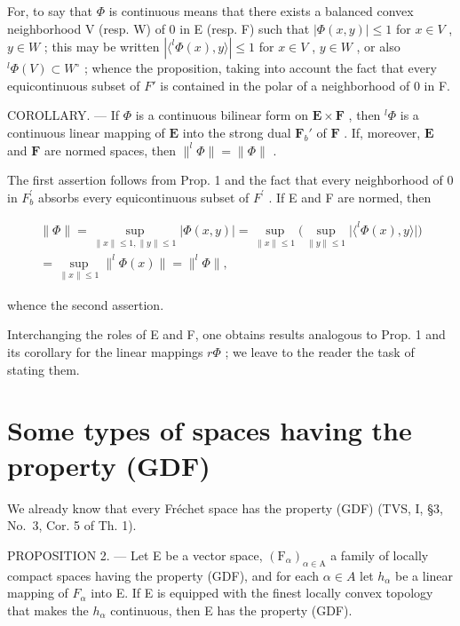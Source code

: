 For, to say that \(\Phi\) is continuous means that there exists a balanced convex neighborhood V (resp. W) of 0 in E (resp. F) such that \(|\Phi(x,y)| \leqslant 1\) for \(x \in V\) , \(y \in W\) ; this may be written \(|\langle^{l}\Phi(x), y \rangle| \leqslant 1\) for \(x \in V\) , \(y \in W\) , or also \(^{l}\Phi(V) \subset W^{\circ}\) ; whence the proposition, taking into account the fact that every equicontinuous subset of \(F'\) is contained in the polar of a neighborhood of 0 in F.

COROLLARY. --- If \(\Phi\) is a continuous bilinear form on \(\mathbf{E} \times \mathbf{F}\) , then \(^l\Phi\) is a continuous linear mapping of \(\mathbf{E}\) into the strong dual \(\mathbf{F}_b'\) of \(\mathbf{F}\) . If, moreover, \(\mathbf{E}\) and \(\mathbf{F}\) are normed spaces, then \(\|^l\Phi\| = \| \Phi \|\) .

The first assertion follows from Prop. 1 and the fact that every neighborhood of 0 in \(F_{b}^{\prime}\) absorbs every equicontinuous subset of \(F^{\prime}\) . If E and F are normed, then

\[
\begin{array}{c} \| \Phi \| = \sup _ {\| x \| \leqslant 1, \| y \| \leqslant 1} | \Phi (x, y) | = \sup _ {\| x \| \leqslant 1} \Big (\sup _ {\| y \| \leqslant 1} \big | \langle^ {l} \Phi (x), y \rangle \big | \Big) \\ = \sup _ {\| x \| \leqslant 1} \| ^ {l} \Phi (x) \| = \| ^ {l} \Phi \|, \end{array}
\]

whence the second assertion.

Interchanging the roles of E and F, one obtains results analogous to Prop. 1 and its corollary for the linear mappings \(r\Phi\) ; we leave to the reader the task of stating them.

\section{Some types of spaces having the property (GDF)}

We already know that every Fréchet space has the property (GDF) (TVS, I, §3, No.~3, Cor. 5 of Th. 1).

PROPOSITION 2. --- Let E be a vector space, \((\mathrm{F}_{\alpha})_{\alpha\in\mathrm{A}}\) a family of locally compact spaces having the property (GDF), and for each \(\alpha\in A\) let \(h_{\alpha}\) be a linear mapping of \(F_{\alpha}\) into E. If E is equipped with the finest locally convex topology that makes the \(h_{\alpha}\) continuous, then E has the property (GDF).

